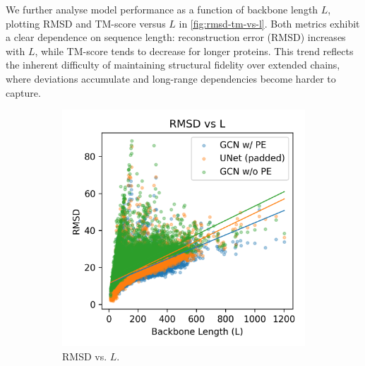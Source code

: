 \documentclass[a4paper,12pt]{article}
\begin{document}
We further analyse model performance as a function of backbone length \(L\), plotting RMSD and TM-score versus \(L\) in \cref{fig:rmsd-tm-vs-l}. Both metrics exhibit a clear dependence on sequence length: reconstruction error (RMSD) increases with \(L\), while TM-score tends to decrease for longer proteins. This trend reflects the inherent difficulty of maintaining structural fidelity over extended chains, where deviations accumulate and long-range dependencies become harder to capture.

\begin{figure}[htbp]
    \centering
    \begin{subfigure}[b]{0.495\textwidth}
        \centering
        \includegraphics[width=\linewidth]{rmsd_vs_L.png}
        \caption{RMSD vs. \(L\).}
        \label{fig:rmsd-vs-l}
    \end{subfigure}
    \begin{subfigure}[b]{0.495\textwidth}
        \centering

\end{subfigure}
\end{figure}
\end{document}
